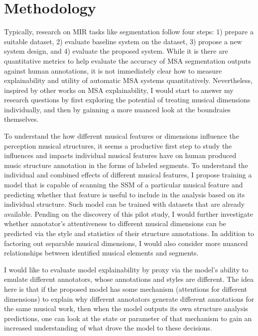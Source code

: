 \section{Methodology}
Typically, research on MIR tasks like segmentation follow four steps: 1) prepare a suitable dataset, 2) evaluate baseline system on the dataset, 3) propose a new system design, and 4) evaluate the proposed system.
While it is there are quantitative metrics to help evaluate the accuracy of MSA segmentation outputs against human annotations, it is not immediately clear how to measure explainability and utility of automatic MSA systems quantitatively.
Nevertheless, inspired by other works on MSA explainability, I would start to answer my research questions by first exploring the potential of treating musical dimensions individually, and then by gainning a more nuanced look at the boundraies themselves.

To understand the how different musical features or dimensions influence the perception musical structures, it seems a productive first step to study the influences and impacts individual musical features have on human produced music structure annotation in the forms of labeled segments.
To understand the individual and combined effects of different musical features, I propose training a model that is capable of scanning the SSM of a particular musical feature and predicting whether that feature is useful to include in the analysis based on its individual structure.
Such model can be trained with datasets that are already available.
Pending on the discovery of this pilot study, I would further investigate whether annotator's attentiveness to different musical dimensions can be predicted via the style and statistics of their structure annotations.
In addition to factoring out separable musical dimensions, I would also consider more nuanced relationships between identified musical elements and segments.

I would like to evaluate model explainability by proxy via the model's ability to emulate different annotators, whose annotations and styles are different.
The idea here is that if the proposed model has some mechanism (attentions for different dimensions) to explain why different annotators generate different annotations for the same musical work, then when the model outputs its own structure analysis predictions, one can look at the state or parameter of that mechanism to gain an increased understanding of what drove the model to these decisions.